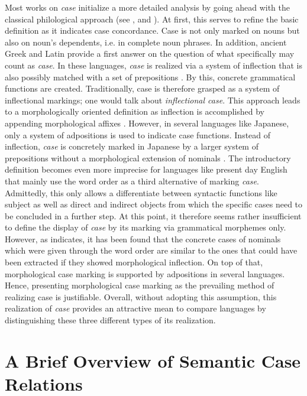 \documentclass[11pt,a4paper,twoside,openright]{scrbook}
\begin{document}
Most works on \textit{case} initialize a more detailed analysis by going ahead with the classical philological approach  (see \citet{blake1994case}, \citet{butt2006case} and \citet{malcukov2012case}). At first, this serves to refine the basic definition as it indicates case concordance. Case is not only marked on nouns but also on noun's dependents, i.e. in complete noun phrases. In addition, ancient Greek and Latin provide a first answer on the question of what specifically may count as \textit{case}. In these languages, \textit{case} is realized via a system of inflection that is also possibly matched with a set of prepositions \citep{blake2012hbocas}. By this, concrete grammatical functions are created. Traditionally, case is therefore grasped as a system of inflectional markings; one would talk about \textit{inflectional case}. This approach leads to a morphologically oriented definition as inflection is accomplished by appending morphological affixes \citep{blake1994case}. 
However, in several languages like Japanese, only a system of adpositions is used to indicate case functions. Instead of inflection, \textit{case} is concretely marked in Japanese by a larger system of prepositions without a morphological extension of nominals \citep{blake2012hbocas}. The introductory definition becomes even more imprecise for languages like present day English that mainly use the word order as a third alternative of marking \textit{case}. Admittedly, this only allows a differentiate between syntactic functions like subject as well as direct and indirect objects from which the specific cases need to be concluded in a further step. At this point, it therefore seems rather insufficient to define the display of \textit{case} by its marking via grammatical morphemes only. However, as \citet{blake1994case} indicates, it has been found that the concrete cases of nominals which were given through the word order are similar to the ones that could have been extracted if they showed morphological inflection. On top of that, morphological case marking is supported by adpositions in several languages. Hence, presenting morphological case marking as the prevailing method of realizing case is justifiable.
Overall, without adopting this assumption, this realization of \textit{case} provides an attractive mean to compare languages by distinguishing these three different types of its realization. 



\section{A Brief Overview of Semantic Case Relations}
\end{document}
